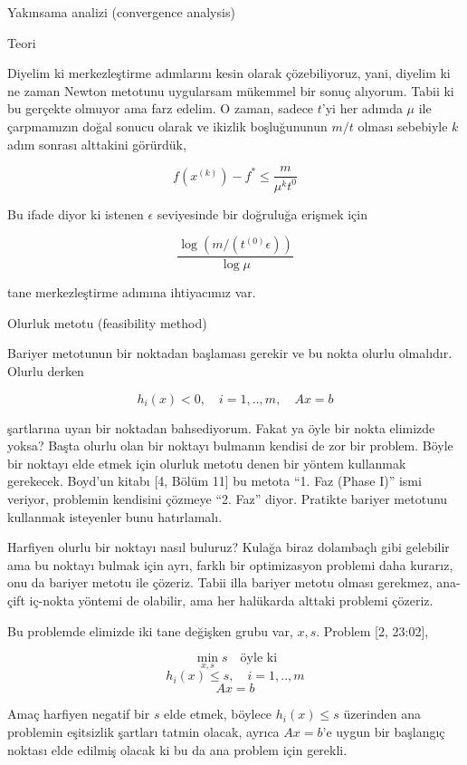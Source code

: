 \documentclass[12pt,fleqn]{article}\usepackage{../../common}
\begin{document}
Yakınsama analizi (convergence analysis) 

Teori 

Diyelim ki merkezleştirme adımlarını kesin olarak çözebiliyoruz, yani,
diyelim ki ne zaman Newton metotunu uygularsam mükemmel bir sonuç
alıyorum. Tabii ki bu gerçekte olmuyor ama farz edelim. O zaman, sadece
$t$'yi her adımda $\mu$ ile çarpmamızın doğal sonucu olarak ve ikizlik
boşluğununun $m / t$ olması sebebiyle $k$ adım sonrası alttakini görürdük, 

$$
f(x^(k)) - f^* \le \frac{m}{\mu^k t^{0}}
$$

Bu ifade diyor ki istenen $\epsilon$ seviyesinde bir doğruluğa erişmek için 

$$
\frac{\log ( m / (t^{(0)} \epsilon) )}{\log \mu}
$$

tane merkezleştirme adımına ihtiyacımız var. 

Olurluk metotu (feasibility method)

Bariyer metotunun bir noktadan başlaması gerekir ve bu nokta olurlu
olmalıdır. Olurlu derken 

$$
h_i(x) < 0, \quad i=1,..,m, \quad Ax = b
$$

şartlarına uyan bir noktadan bahsediyorum. Fakat ya öyle bir nokta elimizde
yoksa? Başta olurlu olan bir noktayı bulmanın kendisi de zor bir
problem. Böyle bir noktayı elde etmek için olurluk metotu denen bir yöntem
kullanmak gerekecek. Boyd'un kitabı [4, Bölüm 11] bu metota ``1. Faz (Phase
I)'' ismi veriyor, problemin kendisini çözmeye ``2. Faz'' diyor. Pratikte
bariyer metotunu kullanmak isteyenler bunu hatırlamalı.

Harfiyen olurlu bir noktayı nasıl buluruz? Kulağa biraz dolambaçlı gibi
gelebilir ama bu noktayı bulmak için ayrı, farklı bir optimizasyon problemi
daha kurarız, onu da bariyer metotu ile çözeriz. Tabii illa bariyer metotu
olması gerekmez, ana-çift iç-nokta yöntemi de olabilir, ama her halükarda
alttaki problemi çözeriz. 

Bu problemde elimizde iki tane değişken grubu var, $x,s$. Problem [2, 23:02], 

$$
\min_{x,s} s \quad \textrm{öyle ki}
$$
$$
h_i(x) \le s, \quad i=1,..,m
$$
$$
Ax = b
$$

Amaç harfiyen negatif bir $s$ elde etmek, böylece $h_i(x) \le s$ üzerinden
ana problemin eşitsizlik şartları tatmin olacak, ayrıca $Ax = b$'e uygun
bir başlangıç noktası elde edilmiş olacak ki bu da ana problem için
gerekli. 
\end{document}
